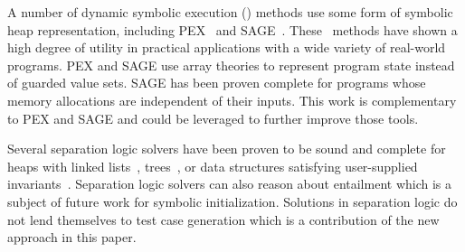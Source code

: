 
A number of dynamic symbolic execution (\dsetxt{}) methods use some form 
of symbolic heap representation, including PEX~\cite{Tillmann:2008} and SAGE~\cite{Elkarablieh:2009}. These~\dsetxt{} methods have shown a high degree of utility in practical applications with a wide variety of real-world programs. PEX and SAGE use array theories to represent program state instead of guarded value sets.
SAGE has been proven complete for programs whose memory allocations are independent of their inputs. This work is complementary to PEX and SAGE and could be leveraged to further improve those tools. 

Several separation logic solvers have been proven to be sound and complete for heaps with linked lists~\cite{Navarro:2011,Cook:2011,Berdine:2005}, trees~\cite{Piskac:2014}, or data structures satisfying user-supplied invariants~\cite{Brotherston:2014}. Separation logic solvers can also reason about entailment which is a subject of future work for symbolic initialization. Solutions in separation logic do not lend themselves to test case generation which is a contribution of the new approach in this paper.


%
%
%

%
%
%
%
%
